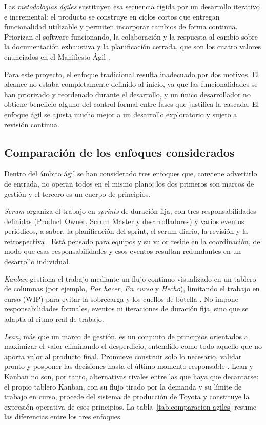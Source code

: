 Las \textit{metodologías ágiles} sustituyen esa secuencia rígida por un desarrollo iterativo e incremental:
el producto se construye en ciclos cortos que entregan funcionalidad utilizable y permiten incorporar
cambios de forma continua. Priorizan el software funcionando, la colaboración y la respuesta al cambio sobre
la documentación exhaustiva y la planificación cerrada, que son los cuatro valores enunciados en el
Manifiesto Ágil \citep{AgileManifesto2001}.

Para este proyecto, el enfoque tradicional resulta inadecuado por dos motivos. El alcance no estaba
completamente definido al inicio, ya que las funcionalidades se han priorizado y reordenado durante el
desarrollo, y un único desarrollador no obtiene beneficio alguno del control formal entre fases que
justifica la cascada. El enfoque ágil se ajusta mucho mejor a un desarrollo exploratorio y sujeto a
revisión continua.

\subsection{Comparación de los enfoques considerados}

Dentro del ámbito ágil se han considerado tres enfoques que, conviene advertirlo de entrada, no operan todos
en el mismo plano: los dos primeros son marcos de gestión y el tercero es un cuerpo de principios.

\textit{Scrum} organiza el trabajo en \textit{sprints} de duración fija, con tres responsabilidades definidas
(Product Owner, Scrum Master y desarrolladores) y varios eventos periódicos, a saber, la planificación del
sprint, el scrum diario, la revisión y la retrospectiva \citep{ScrumGuide2020}. Está pensado para equipos y su
valor reside en la coordinación, de modo que esas responsabilidades y esos eventos resultan redundantes en un
desarrollo individual.

\textit{Kanban} gestiona el trabajo mediante un flujo continuo visualizado en un tablero de columnas (por
ejemplo, \textit{Por hacer}, \textit{En curso} y \textit{Hecho}), limitando el trabajo en curso (WIP) para
evitar la sobrecarga y los cuellos de botella \citep{Anderson2010}. No impone responsabilidades formales,
eventos ni iteraciones de duración fija, sino que se adapta al ritmo real de trabajo.

\textit{Lean}, más que un marco de gestión, es un conjunto de principios orientados a maximizar el valor
eliminando el desperdicio, entendido como todo aquello que no aporta valor al producto final. Promueve
construir solo lo necesario, validar pronto y posponer las decisiones hasta el último momento responsable
\citep{Poppendieck2003}. Lean y Kanban no son, por tanto, alternativas rivales entre las que haya que
decantarse: el propio tablero Kanban, con su flujo tirado por la demanda y su límite de trabajo en curso,
procede del sistema de producción de Toyota \citep{Ohno1988} y constituye la expresión operativa de esos
principios. La tabla~\ref{tab:comparacion-agiles}
resume las diferencias entre los tres enfoques.

